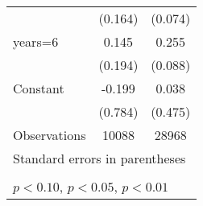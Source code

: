 \begin{table}[htbp]
\begin{tabular}{l*{2}{c}}
                    &     (0.164)         &     (0.074)         \\
\addlinespace
years=6             &       0.145         &       0.255\sym{***}\\
                    &     (0.194)         &     (0.088)         \\
\addlinespace
Constant            &      -0.199         &       0.038         \\
                    &     (0.784)         &     (0.475)         \\
\midrule
Observations        &       10088         &       28968         \\
\bottomrule
\multicolumn{3}{l}{\footnotesize Standard errors in parentheses}\\
\multicolumn{3}{l}{\footnotesize }\\
\multicolumn{3}{l}{\footnotesize \sym{*} \(p<0.10\), \sym{**} \(p<0.05\), \sym{***} \(p<0.01\)}\\
\end{tabular}
\end{table}
